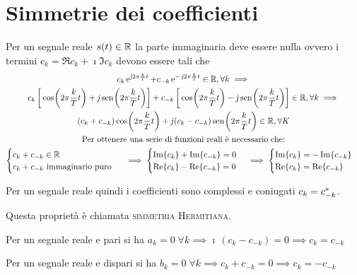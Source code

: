 \section{Simmetrie dei coefficienti}
Per un segnale reale $s(t)\in\mathbb{R}$ la parte immaginaria deve essere nulla ovvero i termini $c_k=\Re{c_k}+\imath \Im{c_k}$ devono essere tali che
\begin{gather*}
	c_k\e{\imath 2\pi\frac{k}{T}t}+c_{-k}\e{-\imath 2\pi\frac{k}{T}t}\in\R, \forall k \implies \\
	c_k \left[\cos{2\pi\frac{k}{T}t}+\imath \sen{2\pi\frac{k}{T}t}\right]
	+c_{-k}\left[\cos{2\pi\frac{k}{T}t}-\imath \sen{2\pi\frac{k}{T}t}\right] \in\R, \forall k \implies \\
	(c_k+c_{-k}) \cos{2\pi\frac{k}{T}t}+\imath\,(c_k-c_{-k})\sen{2\pi\frac{k}{T}t} \in\R, \forall K \\
	\text{Per ottenere una serie di funzioni reali è necessario che:} \\
	\begin{cases}
	c_k+c_{-k}\in\R \\
	c_k+c_{-k}\text{ immaginario puro }
	\end{cases}\implies\begin{cases}
	\Im{c_k}+\Im{c_{-k}}=0 \\
	\Re{c_k}-\Re{c_{-k}}=0
	\end{cases}\implies\begin{cases}
	\Im{c_k}=-\Im{c_{-k}} \\
	\Re{c_k}=\Re{c_{-k}}
	\end{cases}
\end{gather*}

Per un segnale reale quindi i coefficienti sono complessi e coniugati $c_k={c}^\ast_{-k}$.

Questa proprietà è chiamata \textsc{simmetria Hermitiana}.

Per un segnale reale e pari si ha $a_k=0\;\forall k \implies \imath\,(c_k-c_{-k})=0 \implies c_k=c_{-k}$

Per un segnale reale e dispari si ha $b_k=0\;\forall k \implies c_k+c_{-k}=0 \implies c_k=-c_{-k}$

